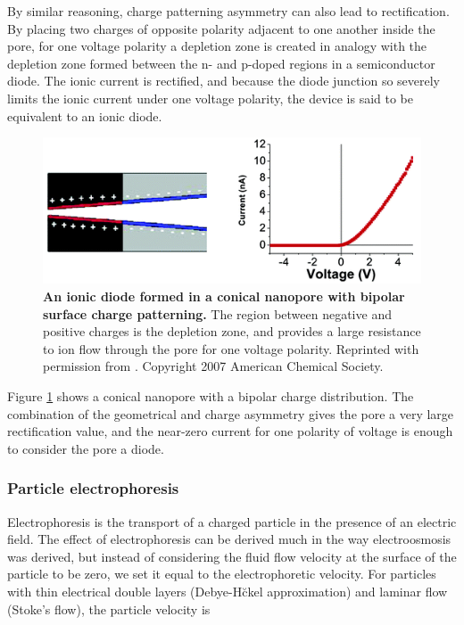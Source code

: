 			By similar reasoning, charge patterning asymmetry can also lead to rectification. By placing two charges of opposite polarity adjacent to one another inside the pore, for one voltage polarity a depletion zone is created in analogy with the depletion zone formed between the n- and p-doped regions in a semiconductor diode. The ionic current is rectified, and because the diode junction so severely limits the ionic current under one voltage polarity, the device is said to be equivalent to an ionic diode.\cite{Vlassiouk2007}
			
			\begin{figure}
				\includegraphics[width=.5\textwidth]{Vlassiouk2007_conicaldiode}
				\caption{\textbf{An ionic diode formed in a conical nanopore with bipolar surface charge patterning.} The region between negative and positive charges is the depletion zone, and provides a large resistance to ion flow through the pore for one voltage polarity. Reprinted with permission from . Copyright 2007 American Chemical Society.}
				\label{fig:Vlassiouk2007conicaldiode}
			\end{figure}
			
			Figure \ref{fig:Vlassiouk2007conicaldiode} shows a conical nanopore with a bipolar charge distribution. The combination of the geometrical and charge asymmetry gives the pore a very large rectification value, and the near-zero current for one polarity of voltage is enough to consider the pore a diode.

			
			


			
			
		
			
			
		
			
			

			
			
		\subsubsection{Particle electrophoresis}
			
			Electrophoresis is the transport of a charged particle in the presence of an electric field. The effect of electrophoresis can be derived much in the way electroosmosis was derived, but instead of considering the fluid flow velocity at the surface of the particle to be zero, we set it equal to the electrophoretic velocity. For particles with thin electrical double layers (Debye-H\u ckel approximation) and laminar flow (Stoke's flow), the particle velocity is
			
